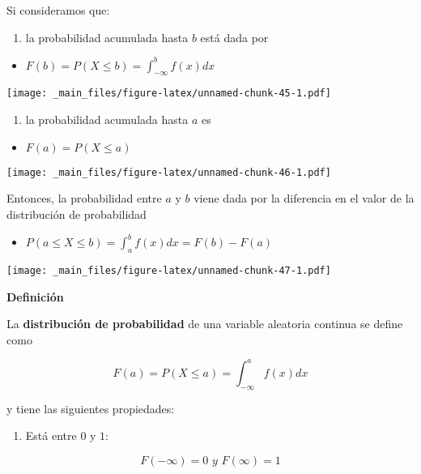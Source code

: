 \documentclass[
]{book}
\providecommand{\tightlist}{%
  \setlength{\itemsep}{0pt}\setlength{\parskip}{0pt}}
\begin{document}
Si consideramos que:

\begin{enumerate}
\def\labelenumi{\arabic{enumi})}
\tightlist
\item
  la probabilidad acumulada hasta \(b\) está dada por
\end{enumerate}

\begin{itemize}
\tightlist
\item
  \(F(b) = P( X \leq b)=\int_{-\infty }^bf(x)dx\)
\end{itemize}

\texttt{[image: \_main\_files/figure-latex/unnamed-chunk-45-1.pdf]}

\begin{enumerate}
\def\labelenumi{\arabic{enumi})}
\setcounter{enumi}{1}
\tightlist
\item
  la probabilidad acumulada hasta \(a\) es
\end{enumerate}

\begin{itemize}
\tightlist
\item
  \(F(a) = P( X \leq a)\)
\end{itemize}

\texttt{[image: \_main\_files/figure-latex/unnamed-chunk-46-1.pdf]}

Entonces, la probabilidad entre \(a\) y \(b\) viene dada por la diferencia en el valor de la distribución de probabilidad

\begin{itemize}
\tightlist
\item
  \(P( a\leq X \leq b) = \int_a^b f(x)dx=F(b)-F(a)\)
\end{itemize}

\texttt{[image: \_main\_files/figure-latex/unnamed-chunk-47-1.pdf]}

\textbf{Definición}

La \textbf{distribución de probabilidad} de una variable aleatoria continua se define como

\[F(a)= P( X\leq a) =\int_{-\infty } ^af(x)dx\]

y tiene las siguientes propiedades:

\begin{enumerate}
\def\labelenumi{\arabic{enumi})}
\tightlist
\item
  Está entre \(0\) y \(1\):
\end{enumerate}

\[F(-\infty )= 0\,\, y \,\,F(\infty )=1\]
\end{document}
